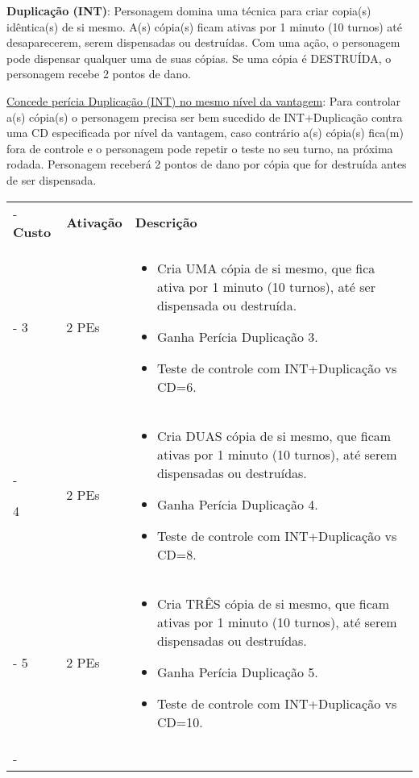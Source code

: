 \begin{small}
\textbf{Duplicação (INT)}: Personagem domina uma técnica para criar copia(s) idêntica(s) de si mesmo. A(s) cópia(s) ficam ativas por 1 minuto (10 turnos) até desaparecerem, serem dispensadas ou destruídas. Com uma ação, o personagem pode dispensar qualquer uma de suas cópias. Se uma cópia é DESTRUÍDA, o personagem recebe 2 pontos de dano. 

\underline{Concede perícia Duplicação (INT) no mesmo nível da vantagem}: Para controlar a(s) cópia(s) o personagem precisa ser bem sucedido de INT+Duplicação contra uma CD especificada por nível da vantagem, caso contrário a(s) cópia(s) fica(m) fora de controle e o personagem pode repetir o teste no seu turno, na próxima rodada. Personagem receberá 2 pontos de dano por cópia que for destruída antes de ser dispensada.

	\begin{tabu}{|X[c]|X[c]|X[4]|} \tabucline-
		\textbf{Custo} 		& \textbf{Ativação}	&	\textbf{Descrição} \\ \tabucline-
		3	& 	2 PEs		& \begin{itemize}
								\item Cria UMA cópia de si mesmo, que fica ativa por 1 minuto (10 turnos), até ser dispensada ou destruída.
								\item Ganha Perícia Duplicação 3.
								\item Teste de controle com INT+Duplicação vs CD=6.
						  	\end{itemize} \\ \tabucline-

		4	& 	2 PEs		& \begin{itemize}
								\item Cria DUAS cópia de si mesmo, que ficam ativas por 1 minuto (10 turnos), até serem dispensadas ou destruídas.
								\item Ganha Perícia Duplicação 4.
								\item Teste de controle com INT+Duplicação vs CD=8.
							\end{itemize} \\ \tabucline-
		5	& 	2 PEs		& \begin{itemize}
								\item Cria TRÊS cópia de si mesmo, que ficam ativas por 1 minuto (10 turnos), até serem dispensadas ou destruídas.
								\item Ganha Perícia Duplicação 5.
								\item Teste de controle com INT+Duplicação vs CD=10.
							\end{itemize} \\ \tabucline-
	\end{tabu}




\end{small}
